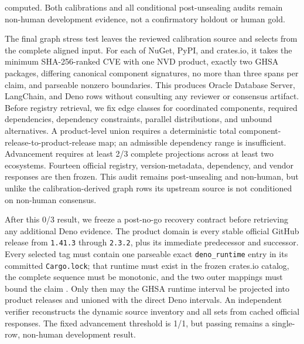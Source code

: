 computed. Both calibrations and all conditional post-unsealing audits remain non-human development evidence, not a confirmatory holdout or human gold.

The final graph stress test leaves the reviewed calibration source and selects from the complete aligned input. For each of NuGet, PyPI, and crates.io, it takes the minimum SHA-256-ranked CVE with one NVD product, exactly two GHSA packages, differing canonical component signatures, no more than three spans per claim, and parseable nonzero boundaries. This produces Oracle Database Server, LangChain, and Deno rows without consulting any reviewer or consensus artifact. Before registry retrieval, we fix edge classes for coordinated components, required dependencies, dependency constraints, parallel distributions, and unbound alternatives. A product-level union requires a deterministic total component-release-to-product-release map; an admissible dependency range is insufficient. Advancement requires at least 2/3 complete projections across at least two ecosystems. Fourteen official registry, version-metadata, dependency, and vendor responses are then frozen. This audit remains post-unsealing and non-human, but unlike the calibration-derived graph rows its upstream source is not conditioned on non-human consensus.

After this 0/3 result, we freeze a post-no-go recovery contract before retrieving any additional Deno evidence. The product domain is every stable official  GitHub release from \texttt{1.41.3} through \texttt{2.3.2}, plus its immediate predecessor and successor. Every selected tag must contain one parseable exact \texttt{deno\_runtime} entry in its committed \texttt{Cargo.lock}; that runtime must exist in the frozen crates.io catalog, the complete sequence must be monotonic, and the two outer mappings must bound the claim . Only then may the GHSA runtime interval be projected into product releases and unioned with the direct Deno intervals. An independent verifier reconstructs the dynamic source inventory and all sets from cached official responses. The fixed advancement threshold is 1/1, but passing remains a single-row, non-human development result.

